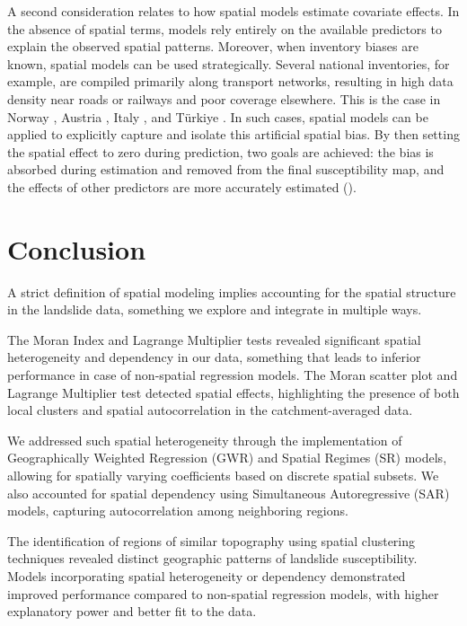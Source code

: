 \documentclass[lineno,pdflatex,sn-basic]{sn-jnl}%
\theoremstyle{thmstyleone}%
\theoremstyle{thmstyletwo}%
\theoremstyle{thmstylethree}%
\begin{document}
A second consideration relates to how spatial models estimate covariate effects. In the absence of spatial terms, models rely entirely on the available predictors to explain the observed spatial patterns. 
Moreover, when inventory biases are known, spatial models can be used strategically. Several national inventories, for example, are compiled primarily along transport networks, resulting in high data density near roads or railways and poor coverage elsewhere. 
This is the case in Norway \citep{krogli2018norwegian}, Austria \citep{lima2021counteracting}, Italy \citep{loche2022landslide}, and Türkiye \citep{tanyacs2022could}. 
In such cases, spatial models can be applied to explicitly capture and isolate this artificial spatial bias. 
By then setting the spatial effect to zero during prediction, two goals are achieved: the bias is absorbed during estimation and removed from the final susceptibility map, and the effects of other predictors are more accurately estimated (\cite{lima2021counteracting}).

\section{Conclusion}
A strict definition of spatial modeling implies accounting for the spatial structure in the landslide data, something we explore and integrate in multiple ways. 

The Moran Index and Lagrange Multiplier tests revealed significant spatial heterogeneity and dependency in our data, something that leads to inferior performance in case of non-spatial regression models. 
The Moran scatter plot and Lagrange Multiplier test detected spatial effects, highlighting the presence of both local clusters and spatial autocorrelation in the catchment-averaged data.

We addressed such spatial heterogeneity through the implementation of Geographically Weighted Regression (GWR) and Spatial Regimes (SR) models, allowing for spatially varying coefficients based on discrete spatial subsets. 
We also accounted for spatial dependency using Simultaneous Autoregressive (SAR) models, capturing autocorrelation among neighboring regions.

The identification of regions of similar topography using spatial clustering techniques revealed distinct geographic patterns of landslide susceptibility. 
Models incorporating spatial heterogeneity or dependency demonstrated improved performance compared to non-spatial regression models, with higher explanatory power and better fit to the data.
\end{document}
